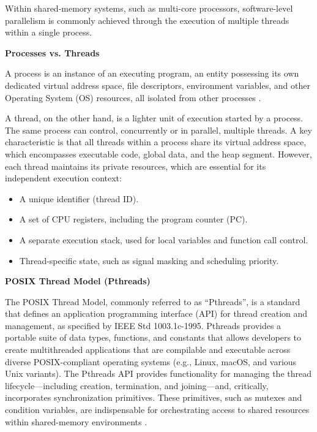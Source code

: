 
Within shared-memory systems, such as multi-core processors, software-level parallelism is commonly achieved through the execution of multiple threads within a single process.

\textbf{Processes vs. Threads}

A process is an instance of an executing program, an entity possessing its own dedicated virtual address space, file descriptors, environment variables, and other Operating System (OS) resources, all isolated from other processes \cite{Pacheco2011}.

A thread, on the other hand, is a lighter unit of execution started by a process. The same process can control, concurrently or in parallel, multiple threads. A key characteristic is that all threads within a process share its virtual address space, which encompasses executable code, global data, and the heap segment. However, each thread maintains its private resources, which are essential for its independent execution context:
\begin{itemize}
    \item A unique identifier (thread ID).
    \item A set of CPU registers, including the program counter (PC).
    \item A separate execution stack, used for local variables and function call control.
    \item Thread-specific state, such as signal masking and scheduling priority.
\end{itemize}

\textbf{POSIX Thread Model (Pthreads)}

The POSIX Thread Model, commonly referred to as “Pthreads”, is a standard that defines an application programming interface (API) for thread creation and management, as specified by IEEE Std 1003.1c-1995. Pthreads provides a portable suite of data types, functions, and constants that allows developers to create multithreaded applications that are compilable and executable across diverse POSIX-compliant operating systems (e.g., Linux, macOS, and various Unix variants). The Pthreads API provides functionality for managing the thread lifecycle—including creation, termination, and joining—and, critically, incorporates synchronization primitives. These primitives, such as mutexes and condition variables, are indispensable for orchestrating access to shared resources within shared-memory environments \cite{Butenhof1997, Pacheco2011}.

